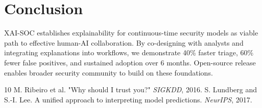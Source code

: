 \documentclass[letterpaper,twocolumn,10pt]{article}
\begin{document}
\section{Conclusion}

XAI-SOC establishes explainability for continuous-time security models as viable path to effective human-AI collaboration. By co-designing with analysts and integrating explanations into workflows, we demonstrate 40\% faster triage, 60\% fewer false positives, and sustained adoption over 6 months. Open-source release enables broader security community to build on these foundations.


\begin{thebibliography}{10}
 M. Ribeiro et al. "Why should I trust you?" \emph{SIGKDD}, 2016.
 S. Lundberg and S.-I. Lee. A unified approach to interpreting model predictions. \emph{NeurIPS}, 2017.
\end{thebibliography}
\end{document}
